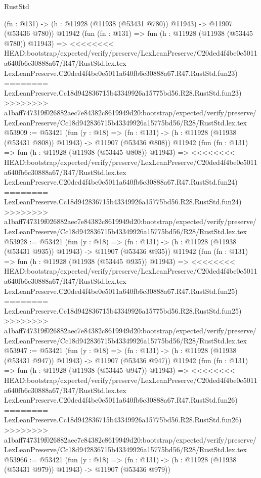 \begin{lexlean}{RustStd}
\begin{coremodule}
{\begin{coremodule}
{{{{{{{{{{{{{{{{{{{{{{{{{{{{{{{{{{{{{{{{{{{{{{{{{{{{{{{{{{{{{{{{{{{{{{{{{{{{{{{{    (fn : @131) -> (h : @11928 (@11938 (@53431 @780)) @11943) -> @11907 (@53436 @780))
    @11942
    (fun (fn : @131) =>
    fun (h : @11928 (@11938 (@53445 @780)) @11943) =>
<<<<<<<< HEAD:bootstrap/expected/verify/preserve/LexLeanPreserve/C20ded4f4be0e5011a640fb6c30888a67/R47/RustStd.lex.tex
    LexLeanPreserve.C20ded4f4be0e5011a640fb6c30888a67.R47.RustStd.fun23)
========
    LexLeanPreserve.Cc18d942836715b43349926a15775bd56.R28.RustStd.fun23)
>>>>>>>> a1baff747319f026882aec7e84382c8619949d20:bootstrap/expected/verify/preserve/LexLeanPreserve/Cc18d942836715b43349926a15775bd56/R28/RustStd.lex.tex
@53909 := @53421
    (fun (y : @18) =>
    (fn : @131) -> (h : @11928 (@11938 (@53431 @808)) @11943) -> @11907 (@53436 @808))
    @11942
    (fun (fn : @131) =>
    fun (h : @11928 (@11938 (@53445 @808)) @11943) =>
<<<<<<<< HEAD:bootstrap/expected/verify/preserve/LexLeanPreserve/C20ded4f4be0e5011a640fb6c30888a67/R47/RustStd.lex.tex
    LexLeanPreserve.C20ded4f4be0e5011a640fb6c30888a67.R47.RustStd.fun24)
========
    LexLeanPreserve.Cc18d942836715b43349926a15775bd56.R28.RustStd.fun24)
>>>>>>>> a1baff747319f026882aec7e84382c8619949d20:bootstrap/expected/verify/preserve/LexLeanPreserve/Cc18d942836715b43349926a15775bd56/R28/RustStd.lex.tex
@53928 := @53421
    (fun (y : @18) =>
    (fn : @131) -> (h : @11928 (@11938 (@53431 @935)) @11943) -> @11907 (@53436 @935))
    @11942
    (fun (fn : @131) =>
    fun (h : @11928 (@11938 (@53445 @935)) @11943) =>
<<<<<<<< HEAD:bootstrap/expected/verify/preserve/LexLeanPreserve/C20ded4f4be0e5011a640fb6c30888a67/R47/RustStd.lex.tex
    LexLeanPreserve.C20ded4f4be0e5011a640fb6c30888a67.R47.RustStd.fun25)
========
    LexLeanPreserve.Cc18d942836715b43349926a15775bd56.R28.RustStd.fun25)
>>>>>>>> a1baff747319f026882aec7e84382c8619949d20:bootstrap/expected/verify/preserve/LexLeanPreserve/Cc18d942836715b43349926a15775bd56/R28/RustStd.lex.tex
@53947 := @53421
    (fun (y : @18) =>
    (fn : @131) -> (h : @11928 (@11938 (@53431 @947)) @11943) -> @11907 (@53436 @947))
    @11942
    (fun (fn : @131) =>
    fun (h : @11928 (@11938 (@53445 @947)) @11943) =>
<<<<<<<< HEAD:bootstrap/expected/verify/preserve/LexLeanPreserve/C20ded4f4be0e5011a640fb6c30888a67/R47/RustStd.lex.tex
    LexLeanPreserve.C20ded4f4be0e5011a640fb6c30888a67.R47.RustStd.fun26)
========
    LexLeanPreserve.Cc18d942836715b43349926a15775bd56.R28.RustStd.fun26)
>>>>>>>> a1baff747319f026882aec7e84382c8619949d20:bootstrap/expected/verify/preserve/LexLeanPreserve/Cc18d942836715b43349926a15775bd56/R28/RustStd.lex.tex
@53966 := @53421
    (fun (y : @18) =>
    (fn : @131) -> (h : @11928 (@11938 (@53431 @979)) @11943) -> @11907 (@53436 @979))
}}}}}}}}}}}}}}}}}}}}}}}}}}}}}}}}}}}}}}}}}}}}}}}}}}}}}}}}}}}}}}}}}}}}}}}}}}}}}}}}
\end{coremodule}}
\end{coremodule}
\end{lexlean}
